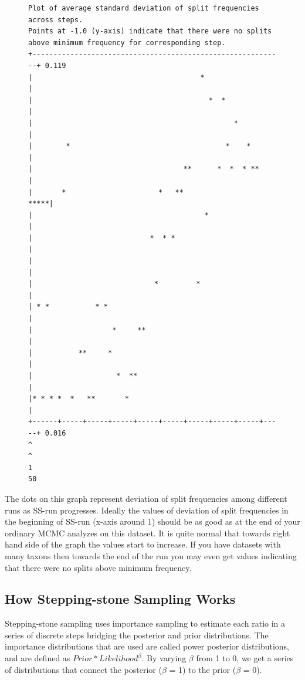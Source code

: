 \documentclass[12pt]{book}
\begin{document}
\begin{figure}[h]
\centering
\begin{BVerbatim}[fontsize=\scriptsize]
Plot of average standard deviation of split frequencies across steps.
Points at -1.0 (y-axis) indicate that there were no splits
above minimum frequency for corresponding step.
+------------------------------------------------------------+ 0.119
|                                        *                   |
|                                          *  *              |
|                                                *           |
|        *                                     *    *        |
|                                    **      *  *  * **      |
|       *                      *   **                   *****|
|                                         *                  |
|                            *  * *                          |
|                                                            |
|                             *         *                    |
| * *           * *                                          |
|                   *     **                                 |
|           **     *                                         |
|                    *  **                                   |
|* * * *  *   **       *                                     |
+------+-----+-----+-----+-----+-----+-----+-----+-----+-----+ 0.016
^                                                            ^
1                                                           50
\end{BVerbatim}
\end{figure}

The dots on this graph represent deviation of split frequencies among different runs as SS-run
progresses. Ideally the values of deviation of split frequencies in the beginning of SS-run (x-axis
around 1) should be as good as at the end of your ordinary MCMC analyzes on this dataset. It is
quite normal that towards right hand side of the graph the values start to increase. If you have
datasets with many taxons then towards the end of the run you may even get values indicating that
there were no splits above minimum frequency.

\subsection{How Stepping-stone Sampling Works}

Stepping-stone sampling uses importance sampling to estimate each ratio in a series of discrete
steps bridging the posterior and prior distributions. The importance distributions that are used
are called power posterior distributions, and are defined as $Prior*Likelihood^{\beta}$. By varying
$\beta$ from 1 to 0, we get a series of distributions that connect the posterior ($\beta$ = 1) to
the prior ($\beta$ = 0).
\end{document}
